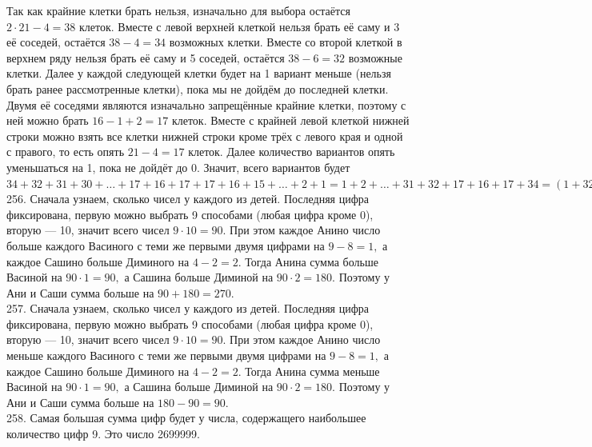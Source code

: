 \documentclass[12pt]{article}
\begin{document}
\begin{center}
\begin{figure}[ht!]
\end{figure}
\end{center}
Так как крайние клетки брать нельзя, изначально для выбора остаётся $2\cdot21-4=38$ клеток. Вместе с левой верхней клеткой нельзя брать её саму и 3 её соседей, остаётся $38-4=34$ возможных клетки. Вместе со второй клеткой в верхнем ряду нельзя брать её саму и 5 соседей, остаётся $38-6=32$ возможные клетки. Далее у каждой следующей клетки будет на 1 вариант меньше (нельзя брать ранее рассмотренные клетки), пока мы не дойдём до последней клетки. Двумя её соседями являются изначально запрещённые крайние клетки, поэтому с ней можно брать $16-1+2=17$ клеток. Вместе с крайней левой клеткой нижней строки можно взять все клетки нижней строки кроме трёх с левого края и одной с правого, то есть опять $21-4=17$ клеток. Далее количество вариантов опять уменьшаться на 1, пока не дойдёт до 0. Значит, всего вариантов будет $34+32+31+30+\ldots+17+16+17+17+16+15+\ldots+2+1=1+2+\ldots+31+32+17+16+17+34=(1+32)+(2+21)+\ldots+(16+17)+84=33\cdot16+84=612.$\\
256. Сначала узнаем, сколько чисел у каждого из детей. Последняя цифра фиксирована, первую можно выбрать 9 способами (любая цифра кроме 0), вторую --- 10, значит всего чисел $9\cdot10=90.$ При этом каждое Анино число больше каждого Васиного с теми же первыми двумя цифрами на $9-8=1,$ а каждое Сашино больше Диминого на $4-2=2.$ Тогда Анина сумма больше Васиной на $90\cdot1=90,$ а Сашина больше Диминой на $90\cdot2=180.$ Поэтому у Ани и Саши сумма больше на $90+180=270.$\\
257. Сначала узнаем, сколько чисел у каждого из детей. Последняя цифра фиксирована, первую можно выбрать 9 способами (любая цифра кроме 0), вторую --- 10, значит всего чисел $9\cdot10=90.$ При этом каждое Анино число меньше каждого Васиного с теми же первыми двумя цифрами на $9-8=1,$ а каждое Сашино больше Диминого на $4-2=2.$ Тогда Анина сумма меньше Васиной на $90\cdot1=90,$ а Сашина больше Диминой на $90\cdot2=180.$ Поэтому у Ани и Саши сумма больше на $180-90=90.$\\
258. Самая большая сумма цифр будет у числа, содержащего наибольшее количество цифр 9. Это число 2699999.\\
\end{document}
